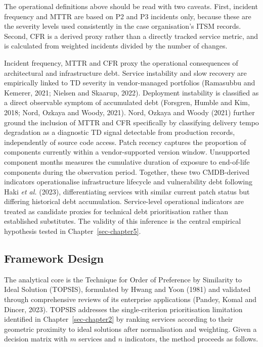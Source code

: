 \documentclass[
  12pt,
  letterpaper,
  12pt,
  oneside,
  english,
  onehalfspacing,
  headsepline]{MastersDoctoralThesis}
\begin{document}
The operational definitions above should be read with two caveats.
First, incident frequency and MTTR are based on P2 and P3 incidents
only, because these are the severity levels used consistently in the
case organisation's ITSM records. Second, CFR is a derived proxy rather
than a directly tracked service metric, and is calculated from weighted
incidents divided by the number of changes.

Incident frequency, MTTR and CFR proxy the operational consequences of
architectural and infrastructure debt. Service instability and slow
recovery are empirically linked to TD severity in vendor-managed
portfolios (Ramasubbu and Kemerer, 2021; Nielsen and Skaarup, 2022).
Deployment instability is classified as a direct observable symptom of
accumulated debt (Forsgren, Humble and Kim, 2018; Nord, Ozkaya and
Woody, 2021). Nord, Ozkaya and Woody (2021) further ground the inclusion
of MTTR and CFR specifically by classifying delivery tempo degradation
as a diagnostic TD signal detectable from production records,
independently of source code access. Patch recency captures the
proportion of components currently within a vendor-supported version
window. Unsupported component months measures the cumulative duration of
exposure to end-of-life components during the observation period.
Together, these two CMDB-derived indicators operationalise
infrastructure lifecycle and vulnerability debt following Haki \emph{et
al.} (2023), differentiating services with similar current patch status
but differing historical debt accumulation. Service-level operational
indicators are treated as candidate proxies for technical debt
prioritisation rather than established substitutes. The validity of this
inference is the central empirical hypothesis tested in
Chapter~\ref{sec-chapter5}.

\subsection{Framework Design}\label{sec-frameworkdesign}

The analytical core is the Technique for Order of Preference by
Similarity to Ideal Solution (TOPSIS), formulated by Hwang and Yoon
(1981) and validated through comprehensive reviews of its enterprise
applications (Pandey, Komal and Dincer, 2023). TOPSIS addresses the
single-criterion prioritisation limitation identified in
Chapter~\ref{sec-chapter2} by ranking services according to their
geometric proximity to ideal solutions after normalisation and
weighting. Given a decision matrix with \(m\) services and \(n\)
indicators, the method proceeds as follows.
\end{document}
